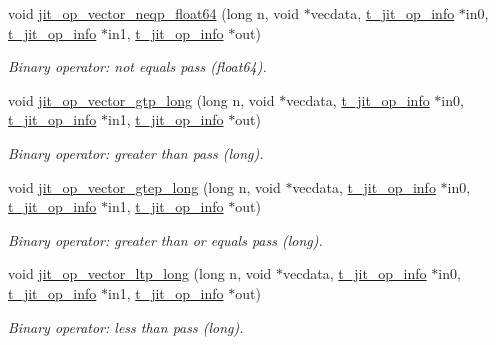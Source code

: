 \begin{DoxyCompactItemize}
void \hyperlink{group__opvecmod_gad8c1462061d6238807b8441818019782}{jit\_\-op\_\-vector\_\-neqp\_\-float64} (long n, void $\ast$vecdata, \hyperlink{structt__jit__op__info}{t\_\-jit\_\-op\_\-info} $\ast$in0, \hyperlink{structt__jit__op__info}{t\_\-jit\_\-op\_\-info} $\ast$in1, \hyperlink{structt__jit__op__info}{t\_\-jit\_\-op\_\-info} $\ast$out)
\begin{DoxyCompactList}\small\item\em Binary operator: not equals pass (float64). \item\end{DoxyCompactList}\item 
void \hyperlink{group__opvecmod_ga23ab889981eec3cbbbcd8bc506fbb4e6}{jit\_\-op\_\-vector\_\-gtp\_\-long} (long n, void $\ast$vecdata, \hyperlink{structt__jit__op__info}{t\_\-jit\_\-op\_\-info} $\ast$in0, \hyperlink{structt__jit__op__info}{t\_\-jit\_\-op\_\-info} $\ast$in1, \hyperlink{structt__jit__op__info}{t\_\-jit\_\-op\_\-info} $\ast$out)
\begin{DoxyCompactList}\small\item\em Binary operator: greater than pass (long). \item\end{DoxyCompactList}\item 
void \hyperlink{group__opvecmod_ga0c242c1894814e6026aba91f82f88ba8}{jit\_\-op\_\-vector\_\-gtep\_\-long} (long n, void $\ast$vecdata, \hyperlink{structt__jit__op__info}{t\_\-jit\_\-op\_\-info} $\ast$in0, \hyperlink{structt__jit__op__info}{t\_\-jit\_\-op\_\-info} $\ast$in1, \hyperlink{structt__jit__op__info}{t\_\-jit\_\-op\_\-info} $\ast$out)
\begin{DoxyCompactList}\small\item\em Binary operator: greater than or equals pass (long). \item\end{DoxyCompactList}\item 
void \hyperlink{group__opvecmod_ga0d0a7fc3ff8faae67b16d6706dc35fd6}{jit\_\-op\_\-vector\_\-ltp\_\-long} (long n, void $\ast$vecdata, \hyperlink{structt__jit__op__info}{t\_\-jit\_\-op\_\-info} $\ast$in0, \hyperlink{structt__jit__op__info}{t\_\-jit\_\-op\_\-info} $\ast$in1, \hyperlink{structt__jit__op__info}{t\_\-jit\_\-op\_\-info} $\ast$out)
\begin{DoxyCompactList}\small\item\em Binary operator: less than pass (long). \item\end{DoxyCompactList}\item 

\end{DoxyCompactItemize}
